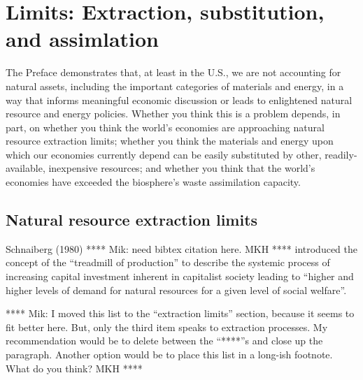 \section{Limits: Extraction, substitution, and assimlation}
\label{sec:limits}

The Preface demonstrates that, at least in the U.S., 
we are not accounting for natural assets, 
including the important categories of materials and energy,
in a way that informs meaningful economic discussion or
leads to enlightened natural resource and energy policies.
Whether you think this is a problem depends, in part, on 
whether you think the world's economies are approaching 
	natural resource extraction limits;
whether you think the materials and energy upon which our economies currently depend
	can be easily substituted by other, readily-available, inexpensive resources; and
whether you think that the world's economies have exceeded 
	the biosphere's waste assimilation capacity.


\subsection{Natural resource extraction limits}
\label{sub:natural_resource_extraction_limits}

Schnaiberg (1980) **** Mik: need bibtex citation here. MKH **** introduced the concept of 
the ``treadmill of production'' to describe the systemic process of
increasing capital investment inherent in capitalist society
leading to ``higher and higher levels of demand for natural resources 
for a given level of social welfare''.\cite[p.297]{Gould2004}

**** Mik: I moved this list to the ``extraction limits'' section, because it seems
to fit better here. 
But, only the third item speaks to extraction processes. 
My recommendation would be to delete between the ``****''s and close up the paragraph.
Another option would be to place this list in a long-ish footnote.
What do you think? MKH ****


